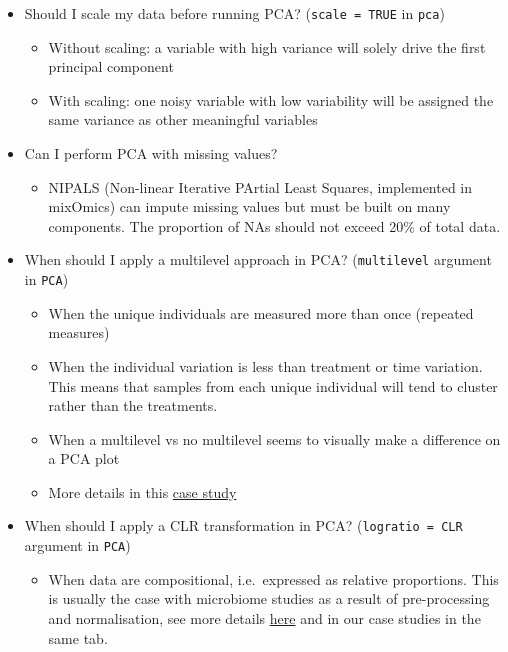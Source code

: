 \documentclass[]{book}
\providecommand{\tightlist}{%
  \setlength{\itemsep}{0pt}\setlength{\parskip}{0pt}}
\begin{document}
\begin{itemize}
\tightlist
\item
  Should I scale my data before running PCA? (\texttt{scale\ =\ TRUE} in \texttt{pca})

  \begin{itemize}
  \tightlist
  \item
    Without scaling: a variable with high variance will solely drive the first principal component
  \item
    With scaling: one noisy variable with low variability will be assigned the same variance as other meaningful variables
  \end{itemize}
\item
  Can I perform PCA with missing values?

  \begin{itemize}
  \tightlist
  \item
    NIPALS (Non-linear Iterative PArtial Least Squares, implemented in mixOmics) can impute missing values but must be built on many components. The proportion of NAs should not exceed 20\% of total data.
  \end{itemize}
\item
  When should I apply a multilevel approach in PCA? (\texttt{multilevel} argument in \texttt{PCA})

  \begin{itemize}
  \tightlist
  \item
    When the unique individuals are measured more than once (repeated measures)
  \item
    When the individual variation is less than treatment or time variation. This means that samples from each unique individual will tend to cluster rather than the treatments.
  \item
    When a multilevel vs no multilevel seems to visually make a difference on a PCA plot
  \item
    More details in this \href{http://mixomics.org/case-studies/multilevel-vac18/}{case study}
  \end{itemize}
\item
  When should I apply a CLR transformation in PCA? (\texttt{logratio\ =\ \textquotesingle{}CLR\textquotesingle{}} argument in \texttt{PCA})

  \begin{itemize}
  \tightlist
  \item
    When data are compositional, i.e.~expressed as relative proportions. This is usually the case with microbiome studies as a result of pre-processing and normalisation, see more details \href{http://mixomics.org/mixmc/}{here} and in our case studies in the same tab.
  \end{itemize}
\end{itemize}
\end{document}
